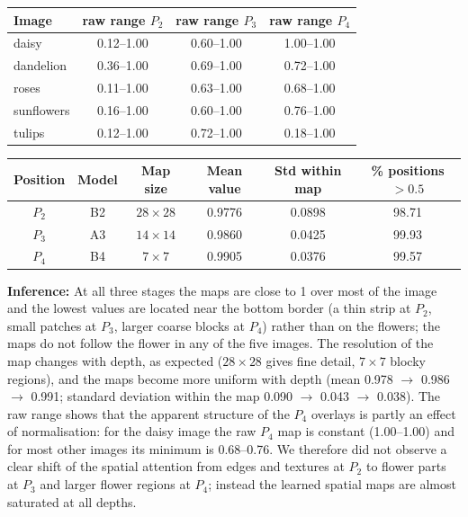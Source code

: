 \documentclass[10pt]{article}
\begin{document}
\begin{center}
\begin{tabular}{|l|c|c|c|}
\hline
\textbf{Image} & \textbf{raw range $P_2$} & \textbf{raw range $P_3$} & \textbf{raw range $P_4$} \\
\hline
daisy & 0.12--1.00 & 0.60--1.00 & 1.00--1.00 \\
\hline
dandelion & 0.36--1.00 & 0.69--1.00 & 0.72--1.00 \\
\hline
roses & 0.11--1.00 & 0.63--1.00 & 0.68--1.00 \\
\hline
sunflowers & 0.16--1.00 & 0.60--1.00 & 0.76--1.00 \\
\hline
tulips & 0.12--1.00 & 0.72--1.00 & 0.18--1.00 \\
\hline
\end{tabular}
\end{center}

\begin{center}
\begin{tabular}{|c|c|c|c|c|c|}
\hline
\textbf{Position} & \textbf{Model} & \textbf{Map size} & \textbf{Mean value} & \textbf{Std within map} & \textbf{\% positions $>0.5$} \\
\hline
$P_2$ & B2 & $28\times28$ & 0.9776 & 0.0898 & 98.71 \\
\hline
$P_3$ & A3 & $14\times14$ & 0.9860 & 0.0425 & 99.93 \\
\hline
$P_4$ & B4 & $7\times7$ & 0.9905 & 0.0376 & 99.57 \\
\hline
\end{tabular}
\end{center}

\textbf{Inference:} At all three stages the maps are close to 1 over most of the image and the lowest values are located near the bottom border (a thin strip at $P_2$, small patches at $P_3$, larger coarse blocks at $P_4$) rather than on the flowers; the maps do not follow the flower in any of the five images.
The resolution of the map changes with depth, as expected ($28\times28$ gives fine detail, $7\times7$ blocky regions), and the maps become more uniform with depth (mean 0.978 $\rightarrow$ 0.986 $\rightarrow$ 0.991; standard deviation within the map 0.090 $\rightarrow$ 0.043 $\rightarrow$ 0.038). The raw range shows that the apparent structure
of the $P_4$ overlays is partly an effect of normalisation: for the daisy image the raw $P_4$ map is constant (1.00--1.00) and for most other images its minimum is 0.68--0.76. We therefore did not observe a clear shift of the spatial attention from edges and textures at $P_2$ to flower parts at $P_3$ and larger flower regions at $P_4$; instead the learned spatial maps are almost saturated at all depths.
\end{document}
